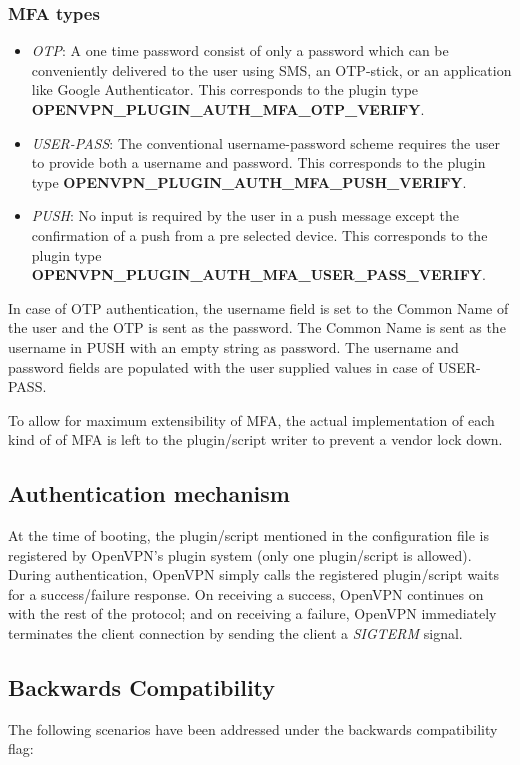 \documentclass[11pt,oneside]{book}
\begin{document}
\subsubsection{MFA types}
\begin{itemize}
    \item \emph{OTP}: A one time password consist of only a password which can be conveniently
        delivered to the user using SMS, an OTP-stick, or an application like Google Authenticator.
        This corresponds to the plugin type\\
        \textbf{OPENVPN\_PLUGIN\_AUTH\_MFA\_OTP\_VERIFY}.
    \item \emph{USER-PASS}: The conventional username-password scheme requires the user to provide
        both a username and password.
        This corresponds to the plugin type \textbf{OPENVPN\_PLUGIN\_AUTH\_MFA\_PUSH\_VERIFY}.
    \item \emph{PUSH}: No input is required by the user in a push message except the confirmation
        of a push from a pre selected device.
        This corresponds to the plugin type \textbf{OPENVPN\_PLUGIN\_AUTH\_MFA\_USER\_PASS\_VERIFY}.
\end{itemize}

In case of OTP authentication, the username field is set to the Common Name of the user and the OTP
is sent as the password. The Common Name is sent as the username in PUSH with an empty string as
password. The username and password fields are populated with the user supplied values in case of
USER-PASS.

To allow for maximum extensibility of MFA, the actual implementation of each kind of of MFA
is left to the plugin/script writer to prevent a vendor lock down.

\subsection{Authentication mechanism}
\label{MFA:Mechanism}
At the time of booting, the plugin/script mentioned in the configuration file is registered
by OpenVPN's plugin system (only one plugin/script is allowed). During authentication, OpenVPN
simply calls the registered plugin/script waits for a success/failure response. On receiving a
success, OpenVPN continues on with the rest of the protocol; and on receiving a failure, OpenVPN
immediately terminates the client connection by sending the client a \emph{SIGTERM} signal.

\subsection{Backwards Compatibility}
The following scenarios have been addressed under the backwards compatibility flag:\\
\end{document}
